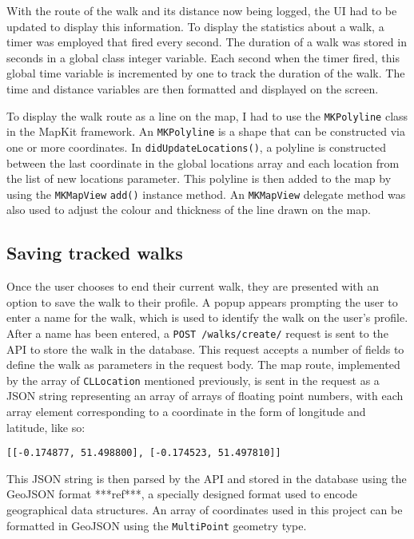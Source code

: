 With the route of the walk and its distance now being logged, the UI had to be updated to display this information. To display the statistics about a walk, a timer was employed that fired every second. The duration of a walk was stored in seconds in a global class integer variable. Each second when the timer fired, this global time variable is incremented by one to track the duration of the walk. The time and distance variables are then formatted and displayed on the screen.

To display the walk route as a line on the map, I had to use the \verb|MKPolyline| class in the MapKit framework. An \verb|MKPolyline| is a shape that can be constructed via one or more coordinates. In \verb|didUpdateLocations()|, a polyline is constructed between the last coordinate in the global locations array and each location from the list of new locations parameter. This polyline is then added to the map by using the \verb|MKMapView| \verb|add()| instance method. An \verb|MKMapView| delegate method was also used to adjust the colour and thickness of the line drawn on the map.

\subsection{Saving tracked walks}

Once the user chooses to end their current walk, they are presented with an option to save the walk to their profile. A popup appears prompting the user to enter a name for the walk, which is used to identify the walk on the user's profile. After a name has been entered, a \verb|POST /walks/create/| request is sent to the API to store the walk in the database. This request accepts a number of fields to define the walk as parameters in the request body. The map route, implemented by the array of \verb|CLLocation| mentioned previously, is sent in the request as a JSON string representing an array of arrays of floating point numbers, with each array element corresponding to a coordinate in the form of longitude and latitude, like so:

\begin{center}
  \verb|[[-0.174877, 51.498800], [-0.174523, 51.497810]]|
\end{center}

This JSON string is then parsed by the API and stored in the database using the GeoJSON format ***ref***, a specially designed format used to encode geographical data structures. An array of coordinates used in this project can be formatted in GeoJSON using the \verb|MultiPoint| geometry type.

